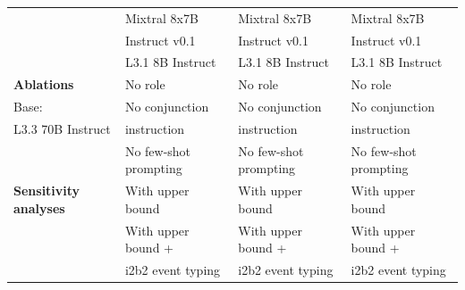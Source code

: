 \begin{table}[htbp]
\begin{ChSixFloatBody}
\begin{adjustbox}{width=0.8\textwidth}
\begin{tabular}{|>{\raggedright\arraybackslash}p{3.5cm}|>{\raggedright\arraybackslash}p{3.5cm}|>{\raggedright\arraybackslash}p{3.5cm}|>{\raggedright\arraybackslash}p{3.5cm}|}
                                & Mixtral 8x7B & Mixtral 8x7B                & Mixtral 8x7B                   \\ 
                                & \quad Instruct v0.1 & \quad Instruct v0.1                & \quad Instruct v0.1                   \\ 
                                & L3.1 8B Instruct             & L3.1 8B Instruct                & L3.1 8B Instruct                  \\ \hline
\parbox{3cm}{\textbf{Ablations}} & No role                  & No role                  & No role                   \\ 
Base: & No conjunction & No conjunction & No conjunction
                                \\ 
L3.3 70B Instruct                        & \quad instruction &  \quad instruction & \quad instruction \\
                                
                                & No few-shot prompting    & No few-shot prompting    & No few-shot prompting     \\ \hline
\textbf{Sensitivity analyses}   & With upper bound         & With upper bound         & With upper bound          \\ 
                                & With upper bound + 
                                                         & With upper bound +  
                                                                                      & With upper bound + \\
                                & \quad i2b2 event typing & \quad i2b2 event typing & \quad i2b2 event typing \\
                                                                                      \hline
\end{tabular}
\end{adjustbox}

\end{ChSixFloatBody}
\end{table}
